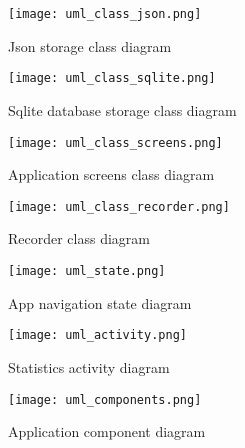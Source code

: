 \begin{figure}[!ht]
\centering
  \texttt{[image: uml\_class\_json.png]}
\caption{Json storage class diagram}
\label{fig:umljson}
\end{figure}

\begin{figure}[!ht]
\centering
  \texttt{[image: uml\_class\_sqlite.png]}
\caption{Sqlite database storage class diagram}
\label{fig:umlsqlite}
\end{figure}

\begin{figure}[!ht]
\centering
  \texttt{[image: uml\_class\_screens.png]}
\caption{Application screens class diagram}
\label{fig:umlscreens}
\end{figure}

\begin{figure}[!ht]
\centering
  \texttt{[image: uml\_class\_recorder.png]}
\caption{Recorder class diagram}
\label{fig:umlrecorder}
\end{figure}

\begin{figure}[!ht]
\centering
  \texttt{[image: uml\_state.png]}
\caption{App navigation state diagram}
\label{fig:umlstate}
\end{figure}

\begin{figure}[!ht]
\centering
  \texttt{[image: uml\_activity.png]}
\caption{Statistics activity diagram}
\label{fig:umlactivity}
\end{figure}

\begin{figure}[!ht]
\centering
  \texttt{[image: uml\_components.png]}
\caption{Application component diagram}
\label{fig:umlcomponents}
\end{figure}

\clearpage

